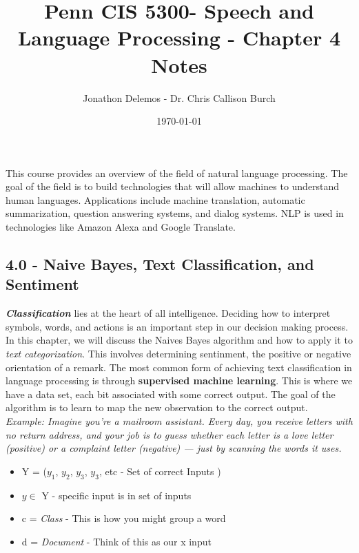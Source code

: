 \documentclass{article}
\title{Penn CIS 5300- Speech and Language Processing - Chapter 4 Notes}
\author{Jonathon Delemos - Dr. Chris Callison Burch}
\date{\today}
\begin{document}
\maketitle

This course provides an overview of the field of natural language processing. The goal of
the field is to build technologies that will allow machines to understand human languages.
Applications include machine translation, automatic summarization, question answering
systems, and dialog systems. NLP is used in technologies like Amazon Alexa and Google
Translate.

\subsection{4.0 - Naive Bayes, Text Classification, and Sentiment}
\textbf{\textit{Classification}} lies at the heart of all intelligence. Deciding how to interpret symbols, words, and actions is an important step in our decision making process.
In this chapter, we will discuss the Naives Bayes algorithm and how to apply it to \textit{text categorization}.
This involves determining sentinment, the positive or negative orientation of a remark.
The most common form of achieving text classification in language processing is through \textbf{supervised machine learning}.
This is where we have a data set, each bit associated with some correct output. The goal of the algorithm is to learn to map
the new observation to the correct output. \newline
\\ \textit{Example: Imagine you're a mailroom assistant. Every day, you receive letters with no return address, and your job is to guess whether each letter is a love letter (positive) or a complaint letter (negative) — just by scanning the words it uses.}

\begin{itemize}
    \item Y = ($y_1$, $y_2$, $y_3$, $y_3$, etc - Set of correct Inputs )
    \item $y \in $ Y - specific input is in set of inputs
    \item c = \textit{Class} - This is how you might group a word
    \item d = \textit{Document} - Think of this as our x input
\end{itemize}
\end{document}
